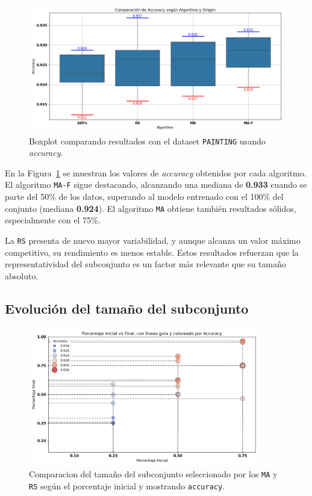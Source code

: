 \begin{figure}[htp]
    \centering
    \includegraphics[width=1\textwidth]{imagenes/evaluaciones/painting/comparacion-por-algoritmo.png}
    \caption{Boxplot comparando resultados con el dataset \texttt{PAINTING} usando \textit{accuracy}.}
    \label{fig:comparacion-por-algoritmo}
\end{figure}

En la Figura~\ref{fig:comparacion-por-algoritmo} se muestran los valores de \textit{accuracy} obtenidos por cada algoritmo.
El algoritmo \texttt{MA-F} sigue destacando, alcanzando una mediana de \textbf{0.933} cuando se parte del 50\% de los datos,
superando al modelo entrenado con el 100\% del conjunto (mediana \textbf{0.924}).
El algoritmo \texttt{MA} obtiene también resultados sólidos, especialmente con el 75\%.

La \texttt{RS} presenta de nuevo mayor variabilidad, y aunque alcanza un valor máximo competitivo, su rendimiento es menos estable.
Estos resultados refuerzan que la representatividad del subconjunto es un factor más relevante que su tamaño absoluto.

\subsection{Evolución del tamaño del subconjunto}

\begin{figure}[htp]
    \centering
    \includegraphics[width=0.9\textwidth]{imagenes/evaluaciones/painting/scatter-por-porcentaje.png}
    \caption{Comparacion del tamaño del subconjunto seleccionado por los \texttt{MA} y \texttt{RS} según el porcentaje inicial y mostrando \texttt{accuracy}.}
    \label{fig:scatter-painting}
\end{figure}

